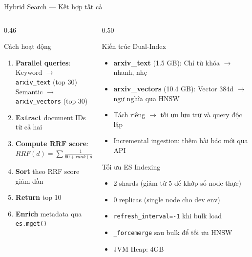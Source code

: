 \begin{frame}{Hybrid Search --- Kết hợp tất cả}
\begin{columns}[T]
\begin{column}{0.46\textwidth}

\begin{block}{Cách hoạt động}
{\scriptsize
\begin{enumerate}\itemsep0pt \parskip0pt 
    \item \textbf{Parallel queries}:\\
    Keyword $\to$ \texttt{arxiv\_text} (top 30)\\
    Semantic $\to$ \texttt{arxiv\_vectors} (top 30)
    \item \textbf{Extract} document IDs từ cả hai
    \item \textbf{Compute RRF score}:\\
    $RRF(d) = \sum \frac{1}{60 + rank(d)}$
    \item \textbf{Sort} theo RRF score giảm dần
    \item \textbf{Return} top 10
    \item \textbf{Enrich} metadata qua \texttt{es.mget()}
\end{enumerate}
}
\end{block}

\end{column}
\begin{column}{0.50\textwidth}

\begin{exampleblock}{Kiến trúc Dual-Index}
{\scriptsize
\begin{itemize}\itemsep0pt \parskip0pt 
    \item \textbf{arxiv\_text} (1.5 GB): Chỉ từ khóa $\to$ nhanh, nhẹ
    \item \textbf{arxiv\_vectors} (10.4 GB): Vector 384d $\to$ ngữ nghĩa qua HNSW
    \item Tách riêng $\to$ tối ưu lưu trữ và query độc lập
    \item Incremental ingestion: thêm bài báo mới qua API
\end{itemize}
}
\end{exampleblock}

\vspace{-0.1cm}

\begin{block}{Tối ưu ES Indexing}
{\scriptsize
\begin{itemize}\itemsep0pt \parskip0pt 
    \item 2 shards (giảm từ 5 để khớp số node thực)
    \item 0 replicas (single node cho dev env)
    \item \texttt{refresh\_interval=-1} khi bulk load
    \item \texttt{\_forcemerge} sau bulk để tối ưu HNSW
    \item JVM Heap: 4GB
\end{itemize}
}
\end{block}

\end{column}
\end{columns}
\end{frame}
